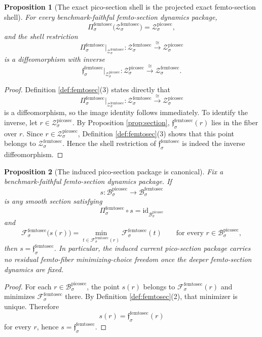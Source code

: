 \documentclass[11pt]{article}
\newcommand{\PicoSectionBody}[1]{\mathcal B_{#1}^{\mathrm{picosec}}}
\newcommand{\PicoSectionShell}[1]{\mathcal Z_{#1}^{\mathrm{picosec}}}
\newcommand{\FemtoSectionBody}[1]{\mathcal B_{#1}^{\mathrm{femtosec}}}
\newcommand{\FemtoSectionProj}[1]{\Pi_{#1}^{\mathrm{femtosec}}}
\newcommand{\FemtoSectionFiber}[2]{\mathcal F_{#1}^{\mathrm{femtosec}}(#2)}
\newcommand{\FemtoSectionPicoMin}[1]{\mathfrak f_{#1}^{\mathrm{femtosec}}}
\newcommand{\FemtoSectionFunctional}[1]{\mathscr F_{#1}^{\mathrm{femtosec}}}
\newcommand{\FemtoSectionShell}[1]{\mathcal Z_{#1}^{\mathrm{femtosec}}}
\newtheorem{proposition}{Proposition}
\begin{document}
\begin{proposition}[The exact pico-section shell is the projected exact femto-section shell]
\label{prop:shell}
For every benchmark-faithful femto-section dynamics package,
\[
\FemtoSectionProj{\sigma}\bigl(\FemtoSectionShell{\sigma}\bigr)
=
\PicoSectionShell{\sigma},
\]
and the shell restriction
\[
\FemtoSectionProj{\sigma}\big|_{\FemtoSectionShell{\sigma}}
:
\FemtoSectionShell{\sigma}\xrightarrow{\cong}\PicoSectionShell{\sigma}
\]
is a diffeomorphism with inverse
\[
\FemtoSectionPicoMin{\sigma}\big|_{\PicoSectionShell{\sigma}}
:
\PicoSectionShell{\sigma}\xrightarrow{\cong}\FemtoSectionShell{\sigma}.
\]
\end{proposition}

\begin{proof}
Definition \ref{def:femtosec}(3) states directly that
\[
\FemtoSectionProj{\sigma}\big|_{\FemtoSectionShell{\sigma}}
:
\FemtoSectionShell{\sigma}\xrightarrow{\cong}\PicoSectionShell{\sigma}
\]
is a diffeomorphism, so the image identity follows immediately. To identify the inverse, let \(r\in\PicoSectionShell{\sigma}\). By Proposition \ref{prop:section}, \(\FemtoSectionPicoMin{\sigma}(r)\) lies in the fiber over \(r\). Since \(r\in\PicoSectionShell{\sigma}\), Definition \ref{def:femtosec}(3) shows that this point belongs to \(\FemtoSectionShell{\sigma}\). Hence the shell restriction of \(\FemtoSectionPicoMin{\sigma}\) is indeed the inverse diffeomorphism.
\end{proof}

\begin{proposition}[The induced pico-section package is canonical]
\label{prop:canonical}
Fix a benchmark-faithful femto-section dynamics package. If
\[
s:\PicoSectionBody{\sigma}\to\FemtoSectionBody{\sigma}
\]
is any smooth section satisfying
\[
\FemtoSectionProj{\sigma}\circ s
=
\mathrm{id}_{\PicoSectionBody{\sigma}}
\]
and
\[
\FemtoSectionFunctional{\sigma}\bigl(s(r)\bigr)
=
\min_{t\in\FemtoSectionFiber{\sigma}{r}}
\FemtoSectionFunctional{\sigma}(t)
\qquad
\text{for every }
r\in\PicoSectionBody{\sigma},
\]
then \(s=\FemtoSectionPicoMin{\sigma}\). In particular, the induced current pico-section package carries no residual femto-fiber minimizing-choice freedom once the deeper femto-section dynamics are fixed.
\end{proposition}

\begin{proof}
For each \(r\in\PicoSectionBody{\sigma}\), the point \(s(r)\) belongs to \(\FemtoSectionFiber{\sigma}{r}\) and minimizes \(\FemtoSectionFunctional{\sigma}\) there. By Definition \ref{def:femtosec}(2), that minimizer is unique. Therefore
\[
s(r)=\FemtoSectionPicoMin{\sigma}(r)
\]
for every \(r\), hence \(s=\FemtoSectionPicoMin{\sigma}\).
\end{proof}
\end{document}
